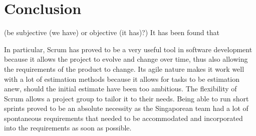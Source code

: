 \section{Conclusion}
(be subjective (we have) or objective (it has)?) It has been found that 

In particular, Scrum has proved to be a very useful tool in software development because it allows the project to evolve and change over time, thus also allowing the requirements of the product to change. Its agile nature makes it work well with a lot of estimation methods because it allows for tasks to be estimation anew, should the initial estimate have been too ambitious. The flexibility of Scrum allows a project group to tailor it to their needs. Being able to run short sprints proved to be an absolute necessity as the Singaporean team had a lot of spontaneous requirements that needed to be accommodated and incorporated into the requirements as soon as possible.